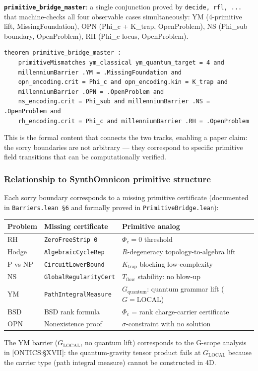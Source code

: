 \documentclass[10pt,a4paper]{article}
\newcommand{\pilcrow}{\S}
\begin{document}
\textbf{\texttt{primitive\_bridge\_master}}: a single conjunction proved by \texttt{\langleby decide, rfl, ...\rangle} that machine-checks all four observable cases simultaneously: YM (4-primitive lift, MissingFoundation), OPN (Phi\_c + K\_trap, OpenProblem), NS (Phi\_sub boundary, OpenProblem), RH (Phi\_c locus, OpenProblem).

\begin{lstlisting}[language=lean]
theorem primitive_bridge_master :
    primitiveMismatches ym_classical ym_quantum_target = 4 and
    millenniumBarrier .YM = .MissingFoundation and
    opn_encoding.crit = Phi_c and opn_encoding.kin = K_trap and
    millenniumBarrier .OPN = .OpenProblem and
    ns_encoding.crit = Phi_sub and millenniumBarrier .NS = .OpenProblem and
    rh_encoding.crit = Phi_c and millenniumBarrier .RH = .OpenProblem
\end{lstlisting}

This is the formal content that connects the two tracks, enabling a paper claim: the sorry boundaries are not arbitrary --- they correspond to specific primitive field transitions that can be computationally verified.

\subsubsection{Relationship to SynthOmnicon primitive structure}

Each sorry boundary corresponds to a missing primitive certificate (documented in \texttt{Barriers.lean §6} and formally proved in \texttt{PrimitiveBridge.lean}):

\begin{table}[htbp]
\centering
\small
{}
\begin{tabularx}{\textwidth}{>{\centering\arraybackslash}X >{\centering\arraybackslash}X >{\centering\arraybackslash}X}
\toprule
\rowcolor{gray!25}\textbf{Problem} & \textbf{Missing certificate} & \textbf{Primitive analog} \\
\midrule
\rowcolors{1}{white}{gray!10}
RH & \texttt{ZeroFreeStrip 0} & $\Phi_c = 0$ threshold \\
Hodge & \texttt{AlgebraicCycleRep} & $R$-degeneracy topology-to-algebra lift \\
P vs NP & \texttt{CircuitLowerBound} & $K_\text{trap}$ blocking low-complexity \\
NS & \texttt{GlobalRegularityCert} & $T_\text{flow}$ stability: no blow-up \\
YM & \texttt{PathIntegralMeasure} & $G_\text{quantum}$: quantum grammar lift ($G = \text{LOCAL}$) \\
BSD & BSD rank formula & $\Phi_c$ = rank charge-carrier certificate \\
OPN & Nonexistence proof & $\sigma$-constraint with no solution \\
\bottomrule
\end{tabularx}
\end{table}

The YM barrier ($G_\text{LOCAL}$, no quantum lift) corresponds to the G-scope analysis in {[}ONTICS:\pilcrow{}XVII{]}: the quantum-gravity tensor product fails at $G_\text{LOCAL}$ because the carrier type (path integral measure) cannot be constructed in 4D.
\end{document}
